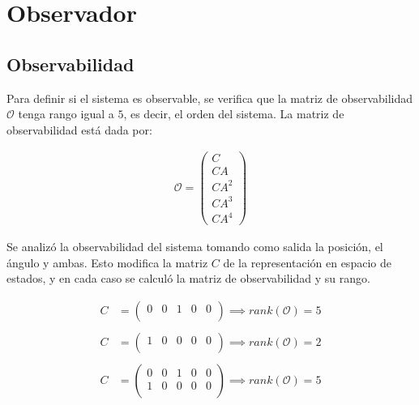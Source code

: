 \documentclass[a4paper,10pt]{article}
\begin{document}
\section{Observador}

\subsection{Observabilidad}

Para definir si el sistema es observable, se verifica que la matriz de observabilidad $\mathcal{O}$ tenga rango igual a $5$, es decir, el orden del sistema. La matriz de observabilidad está dada por:

\begin{gather*}
    \mathcal{O} = \begin{pmatrix}
        C \\ C A \\ C A^2 \\ C A^3 \\ C A^4
    \end{pmatrix}
\end{gather*}

Se analizó la observabilidad del sistema tomando como salida la posición, el ángulo y ambas. Esto modifica la matriz $C$ de la representación en espacio de estados, y en cada caso se calculó la matriz de observabilidad y su rango. 

\begin{align*}
    C &= \begin{pmatrix}
        0 & 0 & 1 & 0 & 0 \\
    \end{pmatrix} \implies rank(\mathcal{O}) = 5 \\\\
    C &= \begin{pmatrix}
        1 & 0 & 0 & 0 & 0 \\
    \end{pmatrix} \implies rank(\mathcal{O}) = 2 \\\\
    C &= \begin{pmatrix}
        0 & 0 & 1 & 0 & 0 \\
        1 & 0 & 0 & 0 & 0 \\
    \end{pmatrix} \implies rank(\mathcal{O}) = 5
\end{align*}
\end{document}
